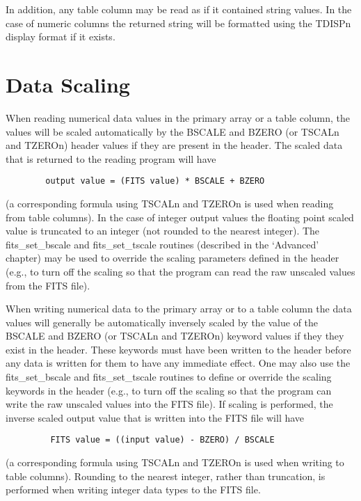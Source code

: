 \documentclass[11pt]{book}
\begin{document}
In addition, any table column may be read as if it contained string values.
In the case of numeric columns the returned string will be formatted
using the TDISPn display format if it exists.


\section{Data Scaling}

When reading numerical data values in the primary array or a
table column, the values will be scaled automatically by the BSCALE and
BZERO (or TSCALn and TZEROn) header values if they are
present in the header.  The scaled data that is returned to the reading
program will have

\begin{verbatim}
        output value = (FITS value) * BSCALE + BZERO
\end{verbatim}
(a corresponding formula using TSCALn and TZEROn is used when reading
from table columns).  In the case of integer output values the floating
point scaled value is truncated to an integer (not rounded to the
nearest integer).  The fits\_set\_bscale and fits\_set\_tscale routines
(described in the `Advanced' chapter) may be used to override the
scaling parameters defined in the header (e.g., to turn off the scaling
so that the program can read the raw unscaled values from the FITS
file).

When writing numerical data to the primary array or to a table column
the data values will generally be automatically inversely scaled by the
value of the BSCALE and BZERO (or TSCALn and TZEROn) keyword values if
they they exist in the header.  These keywords must have been written
to the header before any data is written for them to have any immediate
effect.  One may also use the fits\_set\_bscale and fits\_set\_tscale
routines to define or override the scaling keywords in the header
(e.g., to turn off the scaling so that the program can write the raw
unscaled values into the FITS file). If scaling is performed, the
inverse scaled output value that is written into the FITS file will
have

\begin{verbatim}
         FITS value = ((input value) - BZERO) / BSCALE
\end{verbatim}
(a corresponding formula using TSCALn and TZEROn is used when
writing to table columns).  Rounding to the nearest integer, rather
than truncation, is performed when writing integer data types to the
FITS file.
\end{document}
